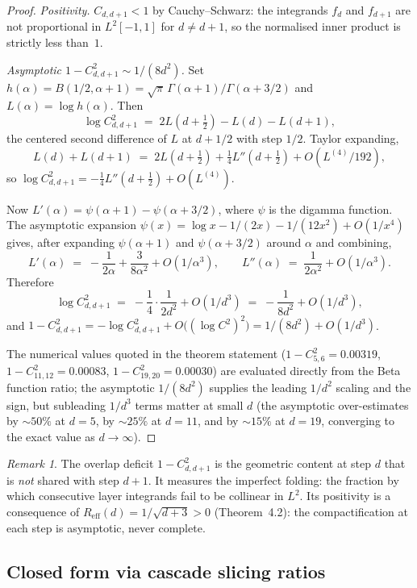 \documentclass[12pt,a4paper]{article}
\theoremstyle{remark}
\newtheorem*{remark}{Remark}
\begin{document}
\begin{proof}
\emph{Positivity.} $C_{d,d+1} < 1$ by Cauchy--Schwarz: the integrands $f_d$ and $f_{d+1}$ are not proportional in $L^2[-1,1]$ for $d \neq d+1$, so the normalised inner product is strictly less than~$1$.

\emph{Asymptotic $1 - C_{d,d+1}^2 \sim 1/(8d^2)$.} Set $h(\alpha) = B(1/2,\alpha+1) = \sqrt{\pi}\,\Gamma(\alpha+1)/\Gamma(\alpha+3/2)$ and $L(\alpha) = \log h(\alpha)$. Then
\[
\log C_{d,d+1}^2 \;=\; 2L(d+\tfrac{1}{2}) - L(d) - L(d+1),
\]
the centered second difference of $L$ at $d+1/2$ with step $1/2$. Taylor expanding,
\[
L(d) + L(d+1) \;=\; 2L(d+\tfrac{1}{2}) + \tfrac{1}{4}L''(d+\tfrac{1}{2}) + O(L^{(4)}/192),
\]
so $\log C_{d,d+1}^2 = -\tfrac{1}{4}L''(d+\tfrac{1}{2}) + O(L^{(4)})$.

Now $L'(\alpha) = \psi(\alpha+1) - \psi(\alpha+3/2)$, where $\psi$ is the digamma function. The asymptotic expansion $\psi(x) = \log x - 1/(2x) - 1/(12x^2) + O(1/x^4)$ gives, after expanding $\psi(\alpha+1)$ and $\psi(\alpha+3/2)$ around $\alpha$ and combining,
\[
L'(\alpha) \;=\; -\frac{1}{2\alpha} + \frac{3}{8\alpha^2} + O(1/\alpha^3),
\qquad
L''(\alpha) \;=\; \frac{1}{2\alpha^2} + O(1/\alpha^3).
\]
Therefore
\[
\log C_{d,d+1}^2 \;=\; -\frac{1}{4}\cdot\frac{1}{2d^2} + O(1/d^3) \;=\; -\frac{1}{8d^2} + O(1/d^3),
\]
and $1 - C_{d,d+1}^2 = -\log C_{d,d+1}^2 + O\bigl((\log C^2)^2\bigr) = 1/(8d^2) + O(1/d^3)$.

The numerical values quoted in the theorem statement ($1 - C_{5,6}^2 = 0.00319$, $1 - C_{11,12}^2 = 0.00083$, $1 - C_{19,20}^2 = 0.00030$) are evaluated directly from the Beta function ratio; the asymptotic $1/(8d^2)$ supplies the leading $1/d^2$ scaling and the sign, but subleading $1/d^3$ terms matter at small $d$ (the asymptotic over-estimates by $\sim 50\%$ at $d=5$, by $\sim 25\%$ at $d=11$, and by $\sim 15\%$ at $d=19$, converging to the exact value as $d\to\infty$).
\end{proof}

\begin{remark}
The overlap deficit $1 - C_{d,d+1}^2$ is the geometric content at step $d$ that is \emph{not} shared with step $d+1$. It measures the imperfect folding: the fraction by which consecutive layer integrands fail to be collinear in $L^2$. Its positivity is a consequence of $R_{\mathrm{eff}}(d) = 1/\sqrt{d+3} > 0$ (Theorem~4.2): the compactification at each step is asymptotic, never complete.
\end{remark}

\subsection{Closed form via cascade slicing ratios}\label{sec:gram-closed-form}
\end{document}
